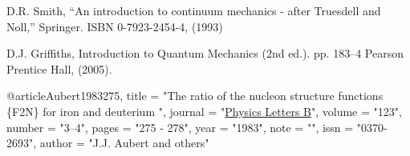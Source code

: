 

         D.R. Smith, ``An introduction to continuum mechanics - after Truesdell and Noll,''
         Springer. ISBN 0-7923-2454-4, (1993)


         D.J. Griffiths, Introduction to Quantum Mechanics (2nd ed.). pp. 183–4 
         Pearson Prentice Hall, (2005).


@article{Aubert1983275,
title = "The ratio of the nucleon structure functions \{F2N\} for iron and deuterium ",
journal = "\href{http://www.sciencedirect.com/science/article/pii/0370269383904379}{Physics Letters B}",
volume = "123",
number = "3–4",
pages = "275 - 278",
year = "1983",
note = "",
issn = "0370-2693",
author = "J.J. Aubert and others"
}

